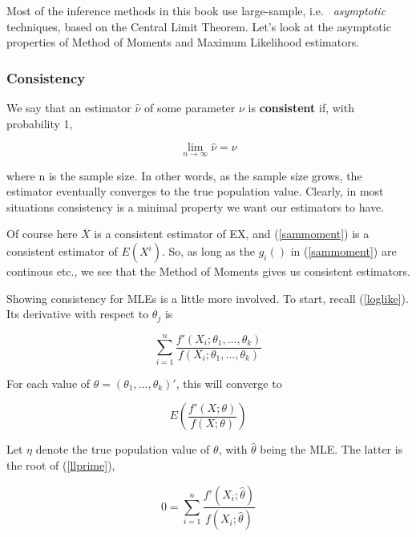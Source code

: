 Most of the inference methods in this book use large-sample, i.e.\ {\it
asymptotic} techniques, based on the Central Limit Theorem.  Let's look
at the asymptotic properties of Method of Moments and Maximum Likelihood
estimators.

\subsubsection{Consistency}

We say that an estimator $\widehat{\nu}$ of some parameter $\nu$ is
{\bf consistent} if, with probability 1,

\begin{equation}
\lim_{{n} \rightarrow \infty} \widehat{\nu} = \nu
\end{equation}

where n is the sample size.  In other words, as the sample size grows,
the estimator eventually converges to the true population value.
Clearly, in most situations consistency is a minimal property we want
our estimators to have.

Of course here $\overline{X}$ is a consistent estimator of EX, and
(\ref{sammoment}) is a consistent estimator of $E(X^i)$.  So, as long as
the $g_i()$ in (\ref{sammoment}) are continous etc., we see that the
Method of Moments gives us consistent estimators.

Showing consistency for MLEs is a little more involved.  To start,
recall (\ref{loglike}).  Its derivative with respect to $\theta_j$ is

\begin{equation}
\label{llprime}
\sum_{i=1}^n 
\frac
{f'(X_i; \theta_1,...,\theta_k)}
{f(X_i; \theta_1,...,\theta_k)}
\end{equation}

For each value of $\theta = (\theta_1,...,\theta_k)'$, this will
converge to 

\begin{equation}
\label{llprimelim}
E \left (
\frac{f'(X;\theta)}
     {f(X;\theta)}
\right )
\end{equation}

Let $\eta$ denote the true population value of $\theta$, with
$\widehat{\theta}$ being the MLE.  The latter is the root of
(\ref{llprime}), 

\begin{equation}
0 = \sum_{i=1}^n 
\frac
{f'(X_i; \widehat{\theta})}
{f(X_i; \widehat{\theta})}
\end{equation}

